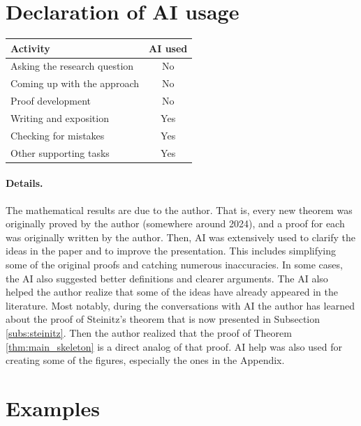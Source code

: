 \documentclass{article}
\newcounter{example}
\begin{document}
\section*{Declaration of AI usage}

\begin{center}
\begin{tabular}{l c}
\hline
\textbf{Activity} & \textbf{AI used} \\
\hline
Asking the research question     & No \\
Coming up with the approach      & No \\
Proof development                & No \\
Writing and exposition           & Yes \\
Checking for mistakes                & Yes \\
Other supporting tasks           & Yes \\
\hline
\end{tabular}
\end{center}

\paragraph{Details.}

The mathematical results are due to the author. That is, every new theorem was originally proved by the author (somewhere around 2024), and a proof for each was originally written by the author. Then, AI was extensively used to clarify the ideas in the paper and to improve the presentation. This includes simplifying some of the original proofs and catching numerous inaccuracies. In some cases, the AI also suggested better definitions and clearer arguments. The AI also helped the author realize that some of the ideas have already appeared in the literature. Most notably, during the conversations with AI the author has learned about the proof of Steinitz's theorem that is now presented in Subsection \ref{subs:steinitz}. Then the author realized that the proof of Theorem \ref{thm:main_skeleton} is a direct analog of that proof. AI help was also used for creating some of the figures, especially the ones in the Appendix.

 


\appendix
\section{Examples}\label{app:examples}
\end{document}
